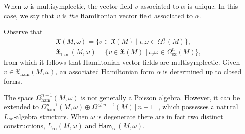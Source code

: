\documentclass[10pt,a4paper]{amsart}
\numberwithin{equation}{section}
\newcommand{\Ham}{\mathsf{Ham}}
\newcommand{\ham}{\text{ham}}
\newcommand{\X}{\mathfrak{X}}
\begin{document}
\begin{Remark}
	When $\omega$ is multisymplectic, the vector field $v$ associated to $\alpha$ is unique. In this case, we say that $v$ is \emph{the} Hamiltonian vector field associated to $\alpha$.
\end{Remark}

Observe that
\begin{align*}
	&\mathfrak{X}(M,\omega) =
	\bigl\lbrace v \in \mathfrak{X}(M) \mid  \iota_v\omega \in \Omega_{\mathrm{cl}}^n(M) \bigr\rbrace,
	\\
	&\mathfrak{X}_{\ham}(M,\omega) =
	\bigl\lbrace v \in \mathfrak{X}(M) \mid  \iota_v\omega \in \Omega_{\mathrm{ex}}^n(M) \bigr\rbrace,
\end{align*}
from which it follows that Hamiltonian vector fields are multisymplectic. Given $v\in\X_\ham(M,\omega)$, an associated Hamiltonian form $\alpha$ is determined up to closed forms.

The space $\Omega_\ham^{n-1}(M,\omega)$ is not generally a Poisson algebra. However, it can be extended to $\Omega_\ham^{n-1}(M,\omega)\oplus\Omega^{\leq n-2}(M)[n{-}1]$, which possesses a natural $L_\infty$-algebra structure. When $\omega$ is degenerate there are in fact two distinct constructions, $L_\infty(M,\omega)$ and $\Ham_\infty(M,\omega)$.
\end{document}
